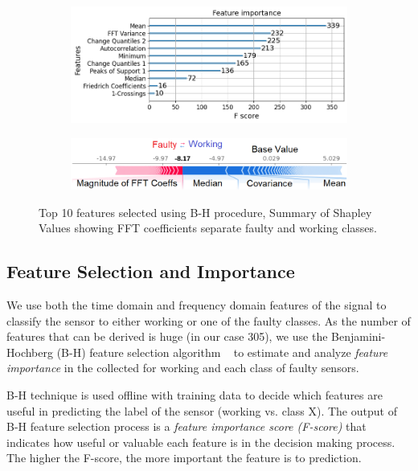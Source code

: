 \begin{figure}
    \begin{subfigure}[t]{0.45\textwidth}
		\centering
		\includegraphics[width=\textwidth]{figures/classification/BH/BH-feature-selection.png}
        \caption{}
        \label{fig:BH_feature_selection}
    \end{subfigure}
    \hfill%
    \begin{subfigure}[b]{0.49\textwidth}
        \centering
        \includegraphics[width=\textwidth]{figures/classification/shapley/shap_expected_4.png}
        \caption{}
        \label{fig:shapley_summary}
    \end{subfigure}
    \caption{\ca Top 10 features selected using B-H procedure, \cb Summary of Shapley Values showing FFT coefficients separate faulty and working classes.}
\end{figure}

\subsection{Feature Selection and Importance} 
\label{subsec:bh} 
We use both the time domain and frequency domain features of the \aout signal to classify the sensor to either working or one of the faulty classes. As the number of features that can be derived is huge (\eg in our case 305), we use the Benjamini-Hochberg (B-H) feature selection algorithm ~\cite{benjamini1995controlling} to estimate and analyze \textit{feature importance} in the \aout collected for working and each class of faulty sensors.

B-H technique is used offline with training data to decide which features are useful in predicting the label of the sensor (\eg working vs. class X). The output of B-H feature selection process is a \textit{feature importance score (F-score)} that indicates how useful or valuable each feature is in the decision making process. The higher the F-score, the more important the feature is to prediction. 

